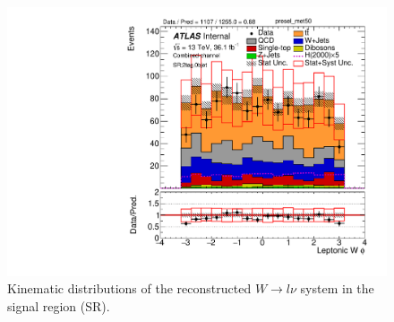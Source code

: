 \begin{figure}[!h]
\begin{center}
\includegraphics[scale=0.33]{./figures/boosted/PlotsInMbbSR/Unblinded/DataMC_2tag_0bjet_SR_lepton_presel_met50_WlepPhi}
\caption{Kinematic distributions of the reconstructed $W \to l\nu$ system in the signal region (SR).}
\label{fig:boosted_SR_wlep}
\end{center}
\end{figure}

